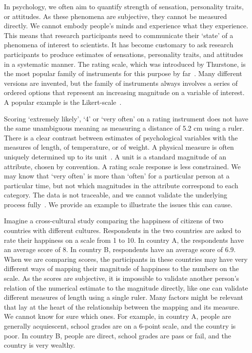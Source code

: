 \documentclass[titlepage, a4paper, 11pt]{article}
\begin{document}
\newpage
In psychology, we often aim to quantify strength of sensation, personality traits, or attitudes. As these phenomena are subjective, they cannot be measured directly. We cannot embody people's minds and experience what they experience. This means that research participants need to communicate their `state' of a phenomena of interest to scientists. It has become customary to ask research participants to produce estimates of sensations, personality traits, and attitudes in a systematic manner. The rating scale, which was introduced by Thurstone, is the most popular family of instruments for this purpose by far~\citep{thurstone_attitudes_1928}. Many different versions are invented, but the family of instruments always involves a series of ordered options that represent an increasing magnitude on a variable of interest. A popular example is the Likert-scale~\citep{likert_technique_1932}.

Scoring `extremely likely', `4' or `very often' on a rating instrument does not have the same unambiguous meaning as measuring a distance of 5.2 cm using a ruler. There is a clear contrast between estimates of psychological variables with the measures of length, of temperature, or of weight. A physical measure is often uniquely determined up to its unit~\citep{humphry_understanding_2013}. A unit is a standard magnitude of an attribute, chosen by convention. A rating scale response is less constrained. We may know that `very often' is more than `often' for a particular person at a particular time, but not which magnitudes in the attribute correspond to each category. The data is not traceable, and we cannot validate the underlying process fully~\citep{uher_quantitative_2018}. We provide an example to illustrate the issues this can cause.

Imagine a cross-cultural study comparing the happiness of citizens of two countries with different cultures. Respondents in the two countries are asked to rate their happiness on a scale from 1 to 10. In country A, the respondents have an average score of 8. In country B, respondents have an average score of 6.9. When we are comparing scores, the participants in these countries may have very different ways of mapping their magnitude of happiness to the numbers on the scale. As the scores are subjective, it is impossible to validate another person's relation of the numerical estimate to the magnitude directly, like one can validate different measures of length using a single ruler. Many factors might be relevant that lay at the heart of the relationship between the mapping and its measure. We cannot know for sure which ones. For example, in country A, people are generally acquiescent, school grades are on a 6-point scale, and the country is poor. In country B, people are direct, school grades are pass or fail, and the country is very wealthy. 
\end{document}
